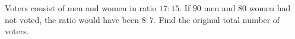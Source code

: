 Voters consist of men and women in ratio $ 17:15 $. If $ 90 $ men and $ 80 $ women had not voted, the ratio would have been $ 8:7 $. Find the original total number of voters.
